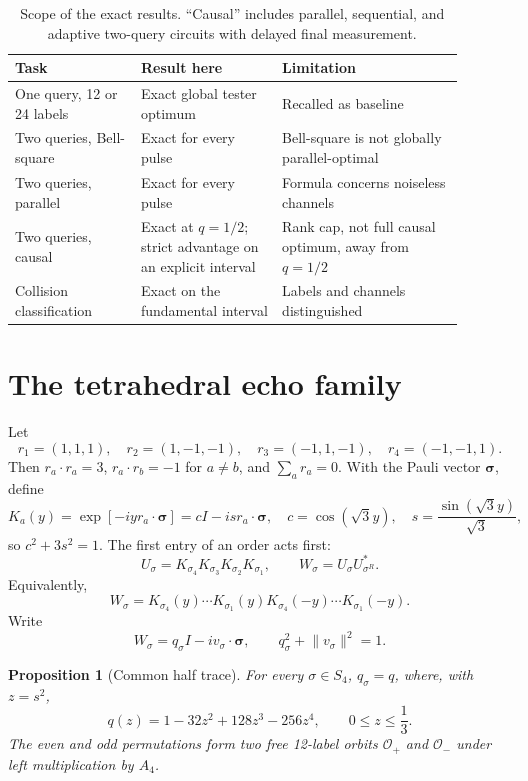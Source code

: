 \documentclass[11pt]{article}
\newtheorem{proposition}[theorem]{Proposition}
\theoremstyle{definition}
\newcommand{\cO}{\mathcal O}
\begin{document}
\begin{table}[t]
\centering
\small
\caption{Scope of the exact results.  ``Causal'' includes parallel,
sequential, and adaptive two-query circuits with delayed final measurement.}
\begin{tabular}{@{}p{0.25\linewidth}p{0.28\linewidth}p{0.36\linewidth}@{}}
\toprule
Task & Result here & Limitation \\
\midrule
One query, 12 or 24 labels & Exact global tester optimum & Recalled as baseline \\
Two queries, Bell-square & Exact for every pulse & Bell-square is not globally parallel-optimal \\
Two queries, parallel & Exact for every pulse & Formula concerns noiseless channels \\
Two queries, causal & Exact at $q=1/2$; strict advantage on an explicit interval & Rank cap, not full causal optimum, away from $q=1/2$ \\
Collision classification & Exact on the fundamental interval & Labels and channels distinguished \\
\bottomrule
\end{tabular}
\end{table}

\section{The tetrahedral echo family}

Let
\[
r_1=(1,1,1),\quad r_2=(1,-1,-1),\quad
r_3=(-1,1,-1),\quad r_4=(-1,-1,1).
\]
Then $r_a\cdot r_a=3$, $r_a\cdot r_b=-1$ for $a\ne b$, and
$\sum_a r_a=0$.  With the Pauli vector $\bm\sigma$, define
\[
 K_a(y)=\exp[-iy r_a\cdot\bm\sigma]
       =cI-is r_a\cdot\bm\sigma,
 \quad c=\cos(\sqrt3y),\quad
 s=\frac{\sin(\sqrt3y)}{\sqrt3},
\]
so $c^2+3s^2=1$.  The first entry of an order acts first:
\[
 U_\sigma=K_{\sigma_4}K_{\sigma_3}K_{\sigma_2}K_{\sigma_1},
 \qquad
 W_\sigma=U_\sigma U_{\sigma^R}^*.
\]
Equivalently,
\[
 W_\sigma=K_{\sigma_4}(y)\cdots K_{\sigma_1}(y)
 K_{\sigma_4}(-y)\cdots K_{\sigma_1}(-y).
\]
Write
\[
 W_\sigma=q_\sigma I-i v_\sigma\cdot\bm\sigma,
 \qquad q_\sigma^2+\lVert v_\sigma\rVert^2=1.
\]

\begin{proposition}[Common half trace]
For every $\sigma\in S_4$, $q_\sigma=q$, where, with $z=s^2$,
\begin{equation}\label{eq:qpoly}
 q(z)=1-32z^2+128z^3-256z^4,
 \qquad 0\le z\le\frac13.
\end{equation}
The even and odd permutations form two free 12-label orbits
$\cO_+$ and $\cO_-$ under left multiplication by $A_4$.
\end{proposition}
\end{document}
